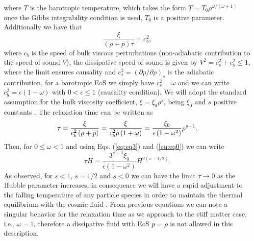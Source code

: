 \documentclass[twocolumn,showpacs,nofootinbib,floats,amsmath,amssymb]{revtex4}
\begin{document}
where $T$ is the barotropic temperature, which takes the form $T = T_{0} \rho ^{\omega /\left(\omega +1\right)}$ once the Gibbs integrability condition is used, $T_{0}$ is a positive parameter. Additionally we have that \cite{maartens}
\begin{equation}
\frac{\xi}{\left(\rho +p\right)\tau} = c_{b}^{2},
\label{eq:relaxationtime}
\end{equation}
where $c_{b}$ is the speed of bulk viscous perturbations (non-adiabatic contribution to the speed of sound $V$), the dissipative speed of sound is given by $V^{2}= c_{s}^{2}+c_{b}^{2} \leq 1$, where the limit ensures causality and $c_{s}^{2}= (\partial p/\partial \rho)_{s}$ is the adiabatic contribution, for a barotropic EoS we simply have $c_{s}^{2}=\omega$ and we can write $c_{b}^{2}=\epsilon \left(1-\omega \right)$ with $0<\epsilon \leq 1$ (causality condition). We will adopt the standard assumption for the bulk viscosity coefficient, $\xi =\xi _{0}\rho^{s}$, being $\xi _{0}$ and $s$ positive constants \cite{barrow, viscous}. The relaxation time can be written as
\begin{equation}
\tau = \frac{\xi }{c_{b}^{2}\left( \rho +p\right) }=\frac{\xi }{%
c_{b}^{2}\rho \left( 1+\omega \right) }=\frac{\xi
_{0}}{\epsilon \left( 1-\omega ^{2}\right)}\rho ^{s-1}. 
\label{eq:eq3}
\end{equation}
Then, for $0\leq \omega <1$ and using Eqs. (\ref{eq:eq3}) and (\ref{eq:eq0}) we can write
\begin{equation}
\tau H=\frac{3^{s-1}\xi _{0}}{\epsilon \left( 1-\omega ^{2}\right) }%
H^{2\left( s-1/2\right)}.
\label{eq:eq7}
\end{equation}
As observed, for $s<1$, $s=1/2$ and $s<0$ we can have the limit $\tau \rightarrow 0$ as the Hubble parameter increases, in consequence we will have a rapid adjustment to the falling temperature of any particle species in order to maintain the thermal equilibrium with the cosmic fluid \cite{chimento}. From previous equations we can note a singular behavior for the relaxation time as we approach to the stiff matter case, i.e., $\omega = 1$, therefore a dissipative fluid with EoS $p = \rho$ is not allowed in this description. 
\end{document}
